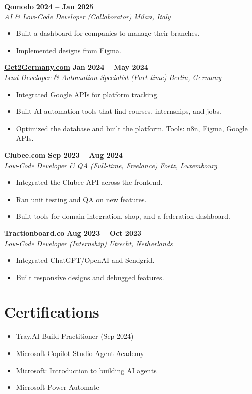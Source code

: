 \documentclass[a4paper,10pt]{article}
\newcommand{\role}[4]{%
 \textbf{#1} \hfill \textbf{#2}\\[1pt]%
 \textit{#3} \hfill \textit{#4}\\[2pt]%
}
\begin{document}
\role{Qomodo}{2024 -- Jan 2025}{AI \& Low-Code Developer (Collaborator)}{Milan, Italy}
\begin{itemize}
 \item Built a dashboard for companies to manage their branches.
 \item Implemented designs from Figma.
\end{itemize}

\role{\href{https://get2germany.com}{Get2Germany.com}}{Jan 2024 -- May 2024}{Lead Developer \& Automation Specialist (Part-time)}{Berlin, Germany}
\begin{itemize}
 \item Integrated Google APIs for platform tracking.
 \item Built AI automation tools that find courses, internships, and jobs.
 \item Optimized the database and built the platform. Tools: n8n, Figma, Google APIs.
\end{itemize}

\role{\href{https://clubee.com}{Clubee.com}}{Sep 2023 -- Aug 2024}{Low-Code Developer \& QA (Full-time, Freelance)}{Foetz, Luxembourg}
\begin{itemize}
 \item Integrated the Clubee API across the frontend.
 \item Ran unit testing and QA on new features.
 \item Built tools for domain integration, shop, and a federation dashboard.
\end{itemize}

\role{\href{https://tractionboard.co}{Tractionboard.co}}{Aug 2023 -- Oct 2023}{Low-Code Developer (Internship)}{Utrecht, Netherlands}
\begin{itemize}
 \item Integrated ChatGPT/OpenAI and Sendgrid.
 \item Built responsive designs and debugged features.
\end{itemize}

\section{Certifications}
\begin{itemize}
 \item Tray.AI Build Practitioner (Sep 2024)
 \item Microsoft Copilot Studio Agent Academy
 \item Microsoft: Introduction to building AI agents
 \item Microsoft Power Automate
\end{itemize}
\end{document}
